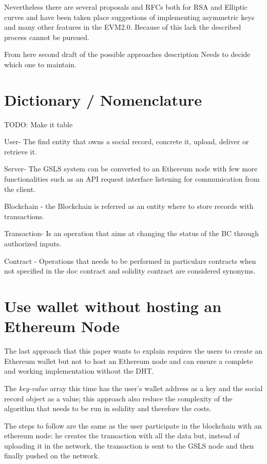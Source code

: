 Nevertheless there are several proposals and RFCs both for RSA and Elliptic curves \citep{ECImplementation} \citep{RSAImplementation} and have been taken place suggestions of implementing asymmetric keys and many other features in the EVM2.0.
Because of this lack the described process cannot be pursued.

\begin{notation}
	From here second draft of the possible approaches description
	Needs to decide which one to maintain.
\end{notation}

\section{Dictionary / Nomenclature}
\begin{notation}
	TODO: Make it table
\end{notation}
User- The find entity that owns a social record, concrete it, upload, deliver or retrieve it.

Server- The GSLS system can be converted to an Ethereum node with few more functionalities such as an API request interface listening for communication from the client.

Blockchain - the Blockchain is referred as an entity where to store records with transactions.

Transaction- Is an operation that aims at changing the status of the BC through authorized inputs.

Contract - Operations that needs to be performed in particulars contracts when not specified in the doc contract and solidity contract are considered synonyms.

\section{Use wallet without hosting an Ethereum Node}

The last approach that this paper wants to explain requires the users to create an Ethereum wallet but not to host an Ethereum node and can ensure a complete and working implementation without the DHT.

The \textit{key-value} array this time has the user's wallet address as a key and the social record object as a value; this approach also reduce the complexity of the algorithm that needs to be run in solidity and therefore the costs.

The steps to follow are the same as the user participate in the blockchain with an ethereum node: he creates the transaction with all the data but, instead of uploading it in the network, the transaction is sent to the GSLS node and then finally pushed on the network.

